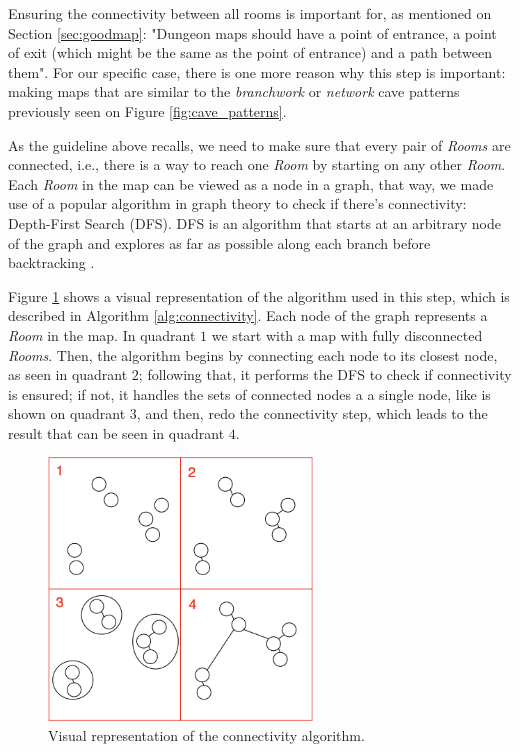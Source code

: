 Ensuring the connectivity between all rooms is important for, as mentioned on Section \ref{sec:goodmap}: "Dungeon maps should have a point of entrance, a point of exit (which might be the same as the point of entrance) and a path between them". For our specific case, there is one more reason why this step is important: making maps that are similar to the \emph{branchwork} or \emph{network} cave patterns previously seen on Figure \ref{fig:cave_patterns}.

As the guideline above recalls, we need to make sure that every pair of \emph{Rooms} are connected, i.e., there is a way to reach one \emph{Room} by starting on any other \emph{Room}. Each \emph{Room} in the map can be viewed as a node in a graph, that way, we made use of a popular algorithm in graph theory to check if there's connectivity: Depth-First Search (DFS). DFS is an algorithm that starts at an arbitrary node of the graph and explores as far as possible along each branch before backtracking \cite{even:2011}.

Figure \ref{fig:connectivity} shows a visual representation of the algorithm used in this step, which is described in Algorithm  \ref{alg:connectivity}. Each node of the graph represents a \emph{Room} in the map. In quadrant \(1\) we start with a map with fully disconnected \emph{Rooms}. Then, the algorithm begins by connecting each node to its closest node, as seen in quadrant \(2\); following that, it performs the DFS to check if connectivity is ensured; if not, it handles the sets of connected nodes a a single node, like is shown on quadrant \(3\), and then, redo the connectivity step, which leads to the result that can be seen in quadrant \(4\).

\begin{figure}[h]
    \caption{Visual representation of the connectivity algorithm.}
    \centerline{\includegraphics[width=7cm]{images/development/graph_connect.png}}
    \label{fig:connectivity}
\end{figure}

